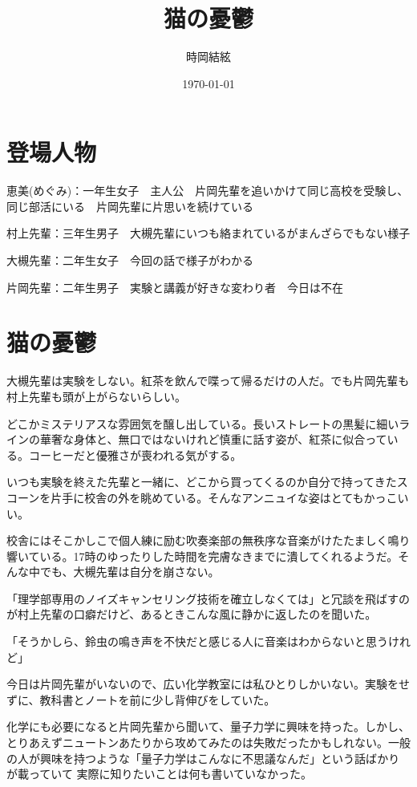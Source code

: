 \documentclass[a4paper,dvipdfmx,12pt]{jsarticle}
\title{猫の憂鬱}
\author{時岡結絃}
\date\today
\begin{document}
\begin{titlepage}
\maketitle
\thispagestyle{empty}
\end{titlepage}


\section{登場人物}
恵美(めぐみ)：一年生女子　主人公　片岡先輩を追いかけて同じ高校を受験し、同じ部活にいる　片岡先輩に片思いを続けている

村上先輩：三年生男子　大槻先輩にいつも絡まれているがまんざらでもない様子

大槻先輩：二年生女子　今回の話で様子がわかる　

片岡先輩：二年生男子　実験と講義が好きな変わり者　今日は不在

\section{猫の憂鬱} 
大槻先輩は実験をしない。紅茶を飲んで喋って帰るだけの人だ。でも片岡先輩も村上先輩も頭が上がらないらしい。

どこかミステリアスな雰囲気を醸し出している。長いストレートの黒髪に細いラインの華奢な身体と、無口ではないけれど慎重に話す姿が、紅茶に似合っている。コーヒーだと優雅さが喪われる気がする。

いつも実験を終えた先輩と一緒に、どこから買ってくるのか自分で持ってきたスコーンを片手に校舎の外を眺めている。そんなアンニュイな姿はとてもかっこいい。

校舎にはそこかしこで個人練に励む吹奏楽部の無秩序な音楽がけたたましく鳴り響いている。17時のゆったりした時間を完膚なきまでに潰してくれるようだ。そんな中でも、大槻先輩は自分を崩さない。

「理学部専用のノイズキャンセリング技術を確立しなくては」と冗談を飛ばすのが村上先輩の口癖だけど、あるときこんな風に静かに返したのを聞いた。

「そうかしら、鈴虫の鳴き声を不快だと感じる人に音楽はわからないと思うけれど」

\vspace{0.2in}

今日は片岡先輩がいないので、広い化学教室には私ひとりしかいない。実験をせずに、教科書とノートを前に少し背伸びをしていた。

化学にも必要になると片岡先輩から聞いて、量子力学に興味を持った。しかし、とりあえずニュートンあたりから攻めてみたのは失敗だったかもしれない。一般の人が興味を持つような「量子力学はこんなに不思議なんだ」という話ばかりが載っていて
実際に知りたいことは何も書いていなかった。
\end{document}
